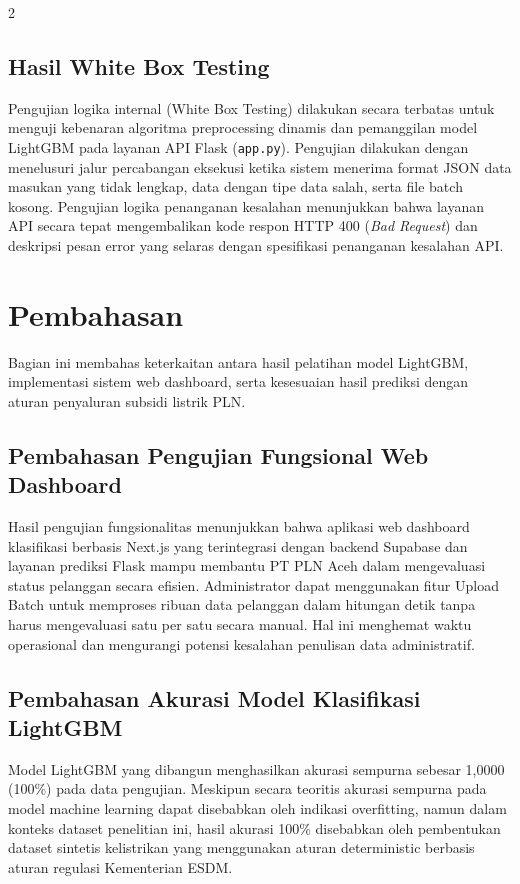 \documentclass[12pt, a4paper, onecolumn, oneside]{report}
\begin{document}
\begin{spacing}{2}
\subsection{Hasil White Box Testing}
Pengujian logika internal (White Box Testing) dilakukan secara terbatas untuk menguji kebenaran algoritma preprocessing dinamis dan pemanggilan model LightGBM pada layanan API Flask (\texttt{app.py}). Pengujian dilakukan dengan menelusuri jalur percabangan eksekusi ketika sistem menerima format JSON data masukan yang tidak lengkap, data dengan tipe data salah, serta file batch kosong. Pengujian logika penanganan kesalahan menunjukkan bahwa layanan API secara tepat mengembalikan kode respon HTTP 400 (\textit{Bad Request}) dan deskripsi pesan error yang selaras dengan spesifikasi penanganan kesalahan API.

\section{Pembahasan}
Bagian ini membahas keterkaitan antara hasil pelatihan model LightGBM, implementasi sistem web dashboard, serta kesesuaian hasil prediksi dengan aturan penyaluran subsidi listrik PLN.

\subsection{Pembahasan Pengujian Fungsional Web Dashboard}
Hasil pengujian fungsionalitas menunjukkan bahwa aplikasi web dashboard klasifikasi berbasis Next.js yang terintegrasi dengan backend Supabase dan layanan prediksi Flask mampu membantu PT PLN Aceh dalam mengevaluasi status pelanggan secara efisien. Administrator dapat menggunakan fitur Upload Batch untuk memproses ribuan data pelanggan dalam hitungan detik tanpa harus mengevaluasi satu per satu secara manual. Hal ini menghemat waktu operasional dan mengurangi potensi kesalahan penulisan data administratif.

\subsection{Pembahasan Akurasi Model Klasifikasi LightGBM}
Model LightGBM yang dibangun menghasilkan akurasi sempurna sebesar 1,0000 (100\%) pada data pengujian. Meskipun secara teoritis akurasi sempurna pada model machine learning dapat disebabkan oleh indikasi overfitting, namun dalam konteks dataset penelitian ini, hasil akurasi 100\% disebabkan oleh pembentukan dataset sintetis kelistrikan yang menggunakan aturan deterministic berbasis aturan regulasi Kementerian ESDM.


\end{spacing}
\end{document}
